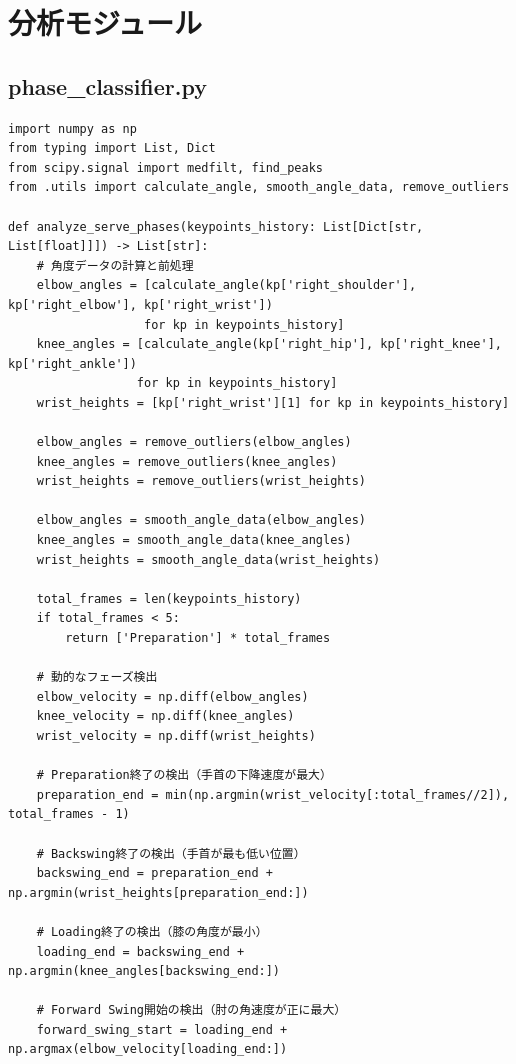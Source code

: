 \documentclass[oneside]{suribt}[11pt]
\begin{document}
\section{分析モジュール}

\subsection{phase\_classifier.py}
\begin{lstlisting}
import numpy as np
from typing import List, Dict
from scipy.signal import medfilt, find_peaks
from .utils import calculate_angle, smooth_angle_data, remove_outliers

def analyze_serve_phases(keypoints_history: List[Dict[str, List[float]]]) -> List[str]:
    # 角度データの計算と前処理
    elbow_angles = [calculate_angle(kp['right_shoulder'], kp['right_elbow'], kp['right_wrist']) 
                   for kp in keypoints_history]
    knee_angles = [calculate_angle(kp['right_hip'], kp['right_knee'], kp['right_ankle']) 
                  for kp in keypoints_history]
    wrist_heights = [kp['right_wrist'][1] for kp in keypoints_history]

    elbow_angles = remove_outliers(elbow_angles)
    knee_angles = remove_outliers(knee_angles)
    wrist_heights = remove_outliers(wrist_heights)

    elbow_angles = smooth_angle_data(elbow_angles)
    knee_angles = smooth_angle_data(knee_angles)
    wrist_heights = smooth_angle_data(wrist_heights)

    total_frames = len(keypoints_history)
    if total_frames < 5:
        return ['Preparation'] * total_frames

    # 動的なフェーズ検出
    elbow_velocity = np.diff(elbow_angles)
    knee_velocity = np.diff(knee_angles)
    wrist_velocity = np.diff(wrist_heights)

    # Preparation終了の検出（手首の下降速度が最大）
    preparation_end = min(np.argmin(wrist_velocity[:total_frames//2]), total_frames - 1)

    # Backswing終了の検出（手首が最も低い位置）
    backswing_end = preparation_end + np.argmin(wrist_heights[preparation_end:])

    # Loading終了の検出（膝の角度が最小）
    loading_end = backswing_end + np.argmin(knee_angles[backswing_end:])

    # Forward Swing開始の検出（肘の角速度が正に最大）
    forward_swing_start = loading_end + np.argmax(elbow_velocity[loading_end:])


\end{lstlisting}
\end{document}
